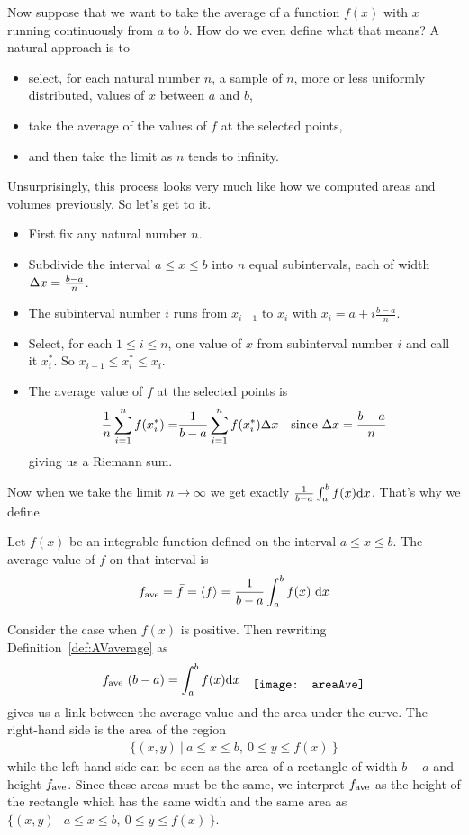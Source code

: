 Now suppose that we want to take the average of a function $f(x)$ with $x$ running
continuously from $a$ to $b$. How do we even define what that means? A natural approach is
to
\begin{itemize}
\item select, for each natural number $n$, a sample of $n$, more or
less uniformly distributed, values of $x$ between $a$ and $b$,
\item take the average of the values of $f$ at the selected points,
\item and then take the limit as $n$ tends to infinity.
\end{itemize}
Unsurprisingly, this process looks very much like how we computed areas and volumes
previously. So let's get to it.
\begin{itemize}
\item
First fix any natural number $n$.
\item
Subdivide the interval $a\le x\le b$ into $n$ equal subintervals,
each of width $\Delta x=\frac{b-a}{n}$.
\item
The subinterval number $i$ runs from $x_{i-1}$ to $x_i$ with
$x_i=a+i\frac{b-a}{n}$.
\item
Select, for each $1\le i\le n$, one value of $x$
from subinterval number $i$ and call it $x_i^*$.
So $x_{i-1}\le x_i^*\le x_i$.
\item
The average value of $f$ at the selected points is
\begin{align*}
\frac{1}{n}\sum_{i=1}^n f(x_i^*)
=&\frac{1}{b-a}\sum_{i=1}^n f(x_i^*) \Delta x
&\text{since $\Delta x=\frac{b-a}{n}$}
\end{align*}
giving us a Riemann sum.
\end{itemize}
Now when we take the limit $n\rightarrow\infty$
we get exactly $\frac{1}{b-a}\int_a^b f(x)\mathrm{d}x$. That's why we define
\begin{defn}\label{def:AVaverage}
Let $f(x)$ be an integrable function defined on the interval
$a\le x\le b$. The average value of $f$ on that interval is
\begin{align*}
f_{\mathrm{ave}}=\bar f=\left< f\right>
=\frac{1}{b-a}\int_a^b f(x)\ \mathrm{d}x
\end{align*}
\end{defn}

Consider the case when $f(x)$ is positive. Then rewriting Definition~\ref{def:AVaverage}
as
\begin{align*}
f_\ave\ (b-a) &= \int_a^b f(x)\dee{x} &
\raisebox{-0.5\height}{\texttt{[image: areaAve]}}
\end{align*}
gives us a link between the average value and the area under the curve. The right-hand
side is the area of the region
\begin{align*}
\big\{(x,y)\ \big|\ a\le x\le b,\ 0\le y\le f(x)\ \big\}
\end{align*}
while the left-hand side can be seen as the area of a rectangle of width $b-a$
and height $f_{\mathrm{ave}}$. Since these areas must be the same, we interpret $f_{\mathrm{ave}}$ as
the height of the rectangle which has the same width and the same area as
$\big\{(x,y)\ \big|\ a\le x\le b,\ 0\le y\le f(x)\ \big\}$.


